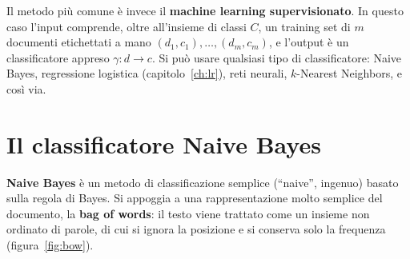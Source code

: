 Il metodo più comune è invece il \textbf{machine learning supervisionato}. In questo caso l'input comprende, oltre all'insieme di classi $C$, un training set di $m$ documenti etichettati a mano $(d_1, c_1), \dots, (d_m, c_m)$, e l'output è un classificatore appreso $\gamma: d \to c$. Si può usare qualsiasi tipo di classificatore: Naive Bayes, regressione logistica (capitolo~\ref{ch:lr}), reti neurali, $k$-Nearest Neighbors, e così via.

\section{Il classificatore Naive Bayes}
\textbf{Naive Bayes} è un metodo di classificazione semplice (\enquote{naive}, ingenuo) basato sulla regola di Bayes. Si appoggia a una rappresentazione molto semplice del documento, la \textbf{bag of words}: il testo viene trattato come un insieme non ordinato di parole, di cui si ignora la posizione e si conserva solo la frequenza (figura~\ref{fig:bow}).

